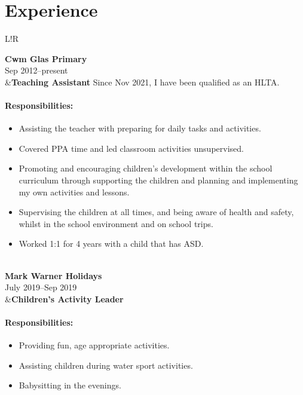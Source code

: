 \documentclass[10pt]{article}
\newcommand\VRule{\color{lightgray}\vrule width 0.5pt}
\begin{document}
\section*{Experience}
\begin{longtable}{L!{\VRule}R}

{\bf Cwm Glas Primary}\\
Sep 2012--present\\
&{\bf Teaching Assistant}\newline
Since Nov 2021, I have been qualified as an HLTA.

\vspace{-3mm}
\paragraph{Responsibilities:}
\begin{itemize}[noitemsep,topsep=0pt]
    \item Assisting the teacher with preparing for daily tasks and activities.
    \item Covered PPA time and led classroom activities unsupervised.
    \item Promoting and encouraging children's development within the school curriculum through supporting the children and planning and implementing my own activities and lessons.
    \item Supervising the children at all times, and being aware of health and safety, whilst in the school environment and on school trips.
    \item Worked 1:1 for 4 years with a child that has ASD.
\end{itemize}
\\

{\bf Mark Warner Holidays}\\
July 2019--Sep 2019\\
&{\bf Children's Activity Leader}\newline

\vspace{-3mm}
\paragraph{Responsibilities:}
\begin{itemize}[noitemsep,topsep=0pt]
    \item Providing fun, age appropriate activities.
    \item Assisting children during water sport activities.
    \item Babysitting in the evenings.
\end{itemize}
\\


\end{longtable}
\end{document}
